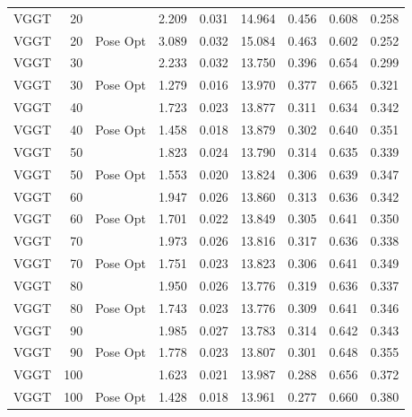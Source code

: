 \begin{table}[H]
\begin{tabular}{lrlrrrrrr}
VGGT & 20 &  & 2.209 & 0.031 & 14.964 & 0.456 & 0.608 & 0.258 \\
VGGT & 20 & Pose Opt & 3.089 & 0.032 & 15.084 & 0.463 & 0.602 & 0.252 \\
VGGT & 30 &  & 2.233 & 0.032 & 13.750 & 0.396 & 0.654 & 0.299 \\
VGGT & 30 & Pose Opt & 1.279 & 0.016 & 13.970 & 0.377 & 0.665 & 0.321 \\
VGGT & 40 &  & 1.723 & 0.023 & 13.877 & 0.311 & 0.634 & 0.342 \\
VGGT & 40 & Pose Opt & 1.458 & 0.018 & 13.879 & 0.302 & 0.640 & 0.351 \\
VGGT & 50 &  & 1.823 & 0.024 & 13.790 & 0.314 & 0.635 & 0.339 \\
VGGT & 50 & Pose Opt & 1.553 & 0.020 & 13.824 & 0.306 & 0.639 & 0.347 \\
VGGT & 60 &  & 1.947 & 0.026 & 13.860 & 0.313 & 0.636 & 0.342 \\
VGGT & 60 & Pose Opt & 1.701 & 0.022 & 13.849 & 0.305 & 0.641 & 0.350 \\
VGGT & 70 &  & 1.973 & 0.026 & 13.816 & 0.317 & 0.636 & 0.338 \\
VGGT & 70 & Pose Opt & 1.751 & 0.023 & 13.823 & 0.306 & 0.641 & 0.349 \\
VGGT & 80 &  & 1.950 & 0.026 & 13.776 & 0.319 & 0.636 & 0.337 \\
VGGT & 80 & Pose Opt & 1.743 & 0.023 & 13.776 & 0.309 & 0.641 & 0.346 \\
VGGT & 90 &  & 1.985 & 0.027 & 13.783 & 0.314 & 0.642 & 0.343 \\
VGGT & 90 & Pose Opt & 1.778 & 0.023 & 13.807 & 0.301 & 0.648 & 0.355 \\
VGGT & 100 &  & 1.623 & 0.021 & 13.987 & 0.288 & 0.656 & 0.372 \\
VGGT & 100 & Pose Opt & 1.428 & 0.018 & 13.961 & 0.277 & 0.660 & 0.380 \\
\bottomrule
\end{tabular}
\end{table}
